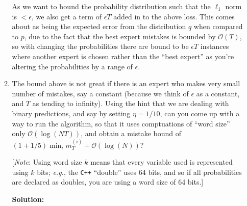 \documentclass[12pt]{article}
\newcommand{\BigO}[1]{\mathcal{O}\left( #1 \right)}
\begin{document}
\begin{enumerate}
\begin{enumerate}
As we want to bound the probability distribution such that the $\ell_{1}$ norm is $< \epsilon$, we also get a term of $\epsilon T$ added in to the above loss. This comes about as being the expected error from the distribution $q$ when compared to $p$, due to the fact that the best expert mistakes is bounded by $\BigO{T}$, so with changing the probabilities there are bound to be $\epsilon T$ instances where another expert is chosen rather than the ``best expert'' as you're altering the probabilities by a range of $\epsilon$.


\item The bound above is not great if there is an expert who makes very small number of mistakes, say a constant (because we think of $\epsilon$ as a constant, and $T$ as tending to infinity). Using the hint that we are dealing with binary predictions, and say by setting $\eta = 1/10$, can you come up with a way to run the algorithm, so that it uses comptuations of ``word size'' only $\BigO{\log(NT)}$, and obtain a mistake bound of $(1 + 1/5)\min_{i} m_{T}^{(i)} + \BigO{\log(N)}$?

[{\em Note}: Using word size $k$ means that every variable used is represented using $k$ bits; {\em e.g.}, the \verb~C++~ ``double'' uses 64 bits, and so if all probabilities are declared as doubles, you are using a word size of 64 bits.]


      {\bf Solution:}

\end{enumerate}
\end{enumerate}
 
\end{document}
